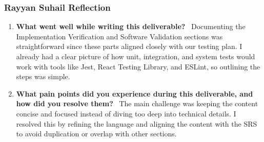 \documentclass[12pt, titlepage]{article}
\begin{document}
\subsubsection*{Rayyan Suhail Reflection}
\begin{enumerate}
\item \textbf{What went well while writing this deliverable?} \
Documenting the Implementation Verification and Software Validation sections was straightforward since these parts aligned closely with our testing plan. I already had a clear picture of how unit, integration, and system tests would work with tools like Jest, React Testing Library, and ESLint, so outlining the steps was simple.

\item \textbf{What pain points did you experience during this deliverable, and how did you resolve them?} \
The main challenge was keeping the content concise and focused instead of diving too deep into technical details. I resolved this by refining the language and aligning the content with the SRS to avoid duplication or overlap with other sections.
\end{enumerate}
\end{document}
